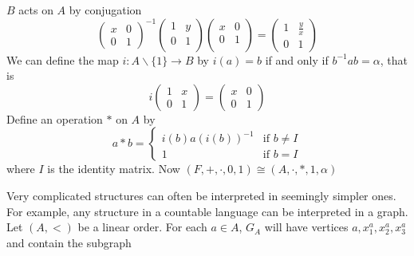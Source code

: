 \documentclass[11pt]{article}
\begin{document}
\(B\) acts on \(A\) by conjugation
\begin{equation*}
\begin{pmatrix}
x&0\\
0&1
\end{pmatrix}^{-1}
\begin{pmatrix}
1&y\\
0&1\\
\end{pmatrix}
\begin{pmatrix}
x&0\\
0&1\\
\end{pmatrix}=
\begin{pmatrix}
1&\frac{y}{x}\\
0&1
\end{pmatrix}
\end{equation*}
We can define the map \(i:A\backslash\{1\}\to B\) by \(i(a)=b\) if and only if
\(b^{-1}ab=\alpha\), that is
\begin{equation*}
i \begin{pmatrix}
1&x\\
0&1
  \end{pmatrix}=
\begin{pmatrix}
x&0\\
0&1
\end{pmatrix}
\end{equation*}
Define an operation \(*\) on \(A\) by
\begin{equation*}
a*b=
\begin{cases}
i(b)a(i(b))^{-1}&\text{if } b\neq I\\
1&\text{if } b=I
\end{cases}
\end{equation*}
where \(I\) is the identity matrix. Now \((F,+,\cdot,0,1)\cong (A,\cdot,*,1,\alpha)\)


Very complicated structures can often be interpreted in seemingly simpler
ones. For example, any structure in a countable language can be interpreted
in a graph. Let \((A,<)\) be a linear order. For each \(a\in A\), \(G_A\) will have
vertices \(a,x_1^a,x_2^a,x_3^a\) and contain the subgraph

\begin{center}
\end{center}
\end{document}
